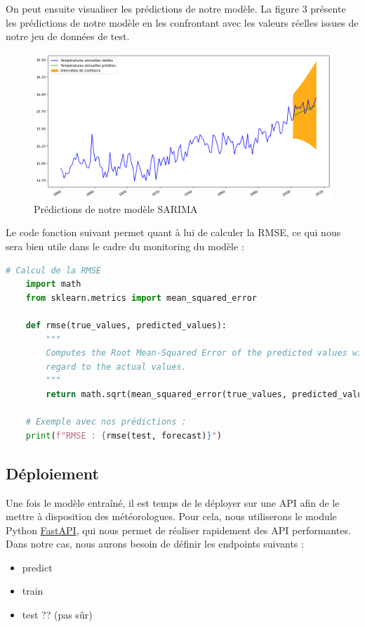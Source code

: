 \documentclass[french]{article}
\begin{document}
    On peut ensuite visualiser les prédictions de notre modèle. La figure 3 présente les prédictions de notre modèle en les confrontant avec les valeurs réelles issues de notre jeu de données de test.

    \begin{figure}[h]
        \includegraphics[width=12cm]{forecast}
        \centering
        \caption{Prédictions de notre modèle SARIMA}
        \centering
    \end{figure}

    Le code fonction suivant permet quant à lui de calculer la RMSE, ce qui nous sera bien utile dans le cadre du monitoring du modèle :
    \begin{lstlisting}[language=Python]
    # Calcul de la RMSE
    import math
    from sklearn.metrics import mean_squared_error
    
    def rmse(true_values, predicted_values):
        """
        Computes the Root Mean-Squared Error of the predicted values with 
        regard to the actual values.
        """
        return math.sqrt(mean_squared_error(true_values, predicted_values))
    
    # Exemple avec nos prédictions :
    print(f"RMSE : {rmse(test, forecast)}")
    \end{lstlisting}


    \subsection{Déploiement}

    Une fois le modèle entraîné, il est temps de le déployer sur une API afin de le mettre à disposition des météorologues. Pour cela, nous utiliserons le module Python \href{https://fastapi.tiangolo.com/}{FastAPI}, qui nous permet de réaliser rapidement des API performantes.
    Dans notre cas, nous aurons besoin de définir les endpoints suivants :
    \begin{itemize}
        \item predict
        \item train
        \item test ?? (pas sûr)
    \end{itemize}
\end{document}
